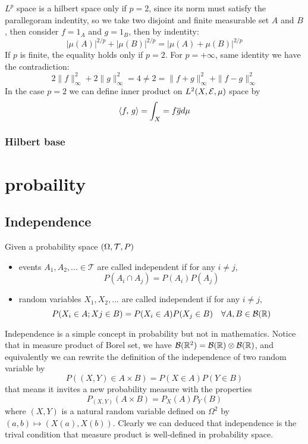 \documentclass[en,geye,blue,normal,12pt,bibend=bibtex]{elegantnote}
\begin{document}
\begin{example}
    \(L^p\) space is a hilbert space only if \(p = 2\), since its norm must satisfy the parallegoram indentity, so we take two disjoint and finite measurable set \(A\) and \(B\), then consider \(f = 1_{A}\) and \(g = 1_{B}\), then by indentity:
    \[ |\mu(A)|^{2/p}+ |\mu(B)|^{2/p} = |\mu(A)+\mu(B)|^{2/p}\]
    If \(p\) is finite, the equality holds only if \(p =2\). For \(p = + \infty\), same identity we have the contradiction:
    \[2\|f\|_{\infty}^2  + 2\|g\|_{\infty}^2 = 4 \neq 2 = \|f+g\|_{\infty}^2 + \|f-g\|_{\infty}^2\]
    In the case \(p=2\) we can define inner product on \(L^2 (X,\mathcal{E} ,\mu)\) space by
    \[\left\langle f,\, g \right\rangle = \int_X = f \overline{g} d\mu \]
\end{example}

\subsubsection{Hilbert base}

\newpage 

\section{probaility}
\subsection{Independence}
\begin{definition}
    Given a probability space \((\Omega ,\mathcal{T} ,P)\)
    \begin{itemize}
        \item  events \(A_1,A_2,... \in \mathcal{T}\) are called independent if for any \(i \neq j\), \[P(A_i \cap A_j) = P(A_i)P(A_j)\]
        \item random variables \(X_1,X_2,...\) are called independent if for any \(i \neq j\), \[P(X_i\in A;Xj \in B) = P(X_i \in A)P(X_j \in B) \quad \forall A,B \in \mathcal{B}(\mathbb{R})\]
    \end{itemize}
\end{definition}

\begin{remark}
    Independence is a simple concept in probability but not in mathematics. Notice that in measure product of Borel set, we have \(\mathcal{B}(\mathbb{R}^2) = \mathcal{B}(\mathbb{R}) \otimes \mathcal{B}(\mathbb{R})\), and equivalently we can rewrite the definition of the independence of two random variable by 
    \[P((X,Y) \in A \times B) = P(X \in A)P(Y \in B)\]
    that means it invites a new probability measure with the properties
    \[P_{(X,Y)}(A \times B) = P_X(A)P_Y(B)\]
    where \((X,Y)\) is a natural random variable defined on \(\Omega^2\) by \((a,b) \mapsto (X(a),X(b))\). Clearly we can deduced that independence is the trival condition that measure product is well-defined in probability space.
\end{remark}
\end{document}
